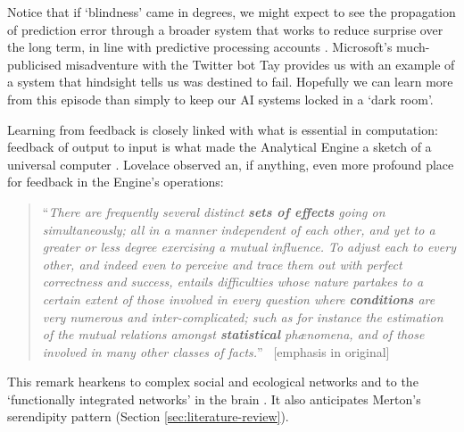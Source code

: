 Notice that if `blindness' came in degrees, we might expect to see the
propagation of prediction error through a broader system that works to
reduce surprise over the long term, in line with predictive processing
accounts \cite{Kiverstein2017,Friston2012}.  Microsoft's
much-publicised misadventure with the Twitter bot {\sf Tay}
\cite{wolf2017we} provides us with an example of a system that
hindsight tells us was destined to fail.  Hopefully we can learn more
from this episode than simply to keep our AI systems locked in a `dark
room'.

Learning from feedback is closely linked with what is essential in
computation: feedback of output to input is what made the Analytical
Engine a sketch of a universal computer \cite[p.~24]{Webb1980}.
Lovelace observed an, if anything, even more profound place for
feedback in the Engine's operations:
\begin{quote}
``\emph{There are frequently several distinct \emph{\textbf{sets of effects}} going on simultaneously; all in a manner independent of each other, and yet to a greater or less degree exercising a mutual influence. To adjust each to every other, and indeed even to perceive and trace them out with perfect correctness and success, entails difficulties whose nature partakes to a certain extent of those involved in every question where \emph{\textbf{conditions}} are very numerous and inter-complicated; such as for instance the estimation of the mutual relations amongst \emph{\textbf{statistical}} ph\ae nomena, and of those involved in many other classes of facts.}'' \cite[p.~710]{lovelace}~{[}emphasis in original{]}
\end{quote}
This remark hearkens to complex social and ecological networks and to
the `functionally integrated networks' in the brain \cite{Pessoa2017}.
It also anticipates Merton's serendipity pattern (Section
\ref{sec:literature-review}).
 

